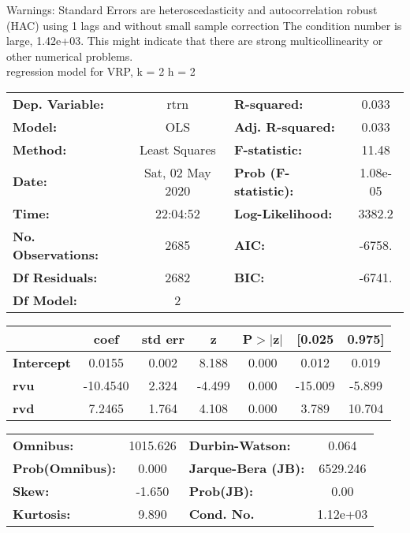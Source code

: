 Warnings: \newline
 [1] Standard Errors are heteroscedasticity and autocorrelation robust (HAC) using 1 lags and without small sample correction \newline
 [2] The condition number is large, 1.42e+03. This might indicate that there are \newline
 strong multicollinearity or other numerical problems.\\ 

regression model for VRP, k = 2 h = 2\begin{center}
\begin{tabular}{lclc}
\toprule
\textbf{Dep. Variable:}    &       rtrn       & \textbf{  R-squared:         } &     0.033   \\
\textbf{Model:}            &       OLS        & \textbf{  Adj. R-squared:    } &     0.033   \\
\textbf{Method:}           &  Least Squares   & \textbf{  F-statistic:       } &     11.48   \\
\textbf{Date:}             & Sat, 02 May 2020 & \textbf{  Prob (F-statistic):} &  1.08e-05   \\
\textbf{Time:}             &     22:04:52     & \textbf{  Log-Likelihood:    } &    3382.2   \\
\textbf{No. Observations:} &        2685      & \textbf{  AIC:               } &    -6758.   \\
\textbf{Df Residuals:}     &        2682      & \textbf{  BIC:               } &    -6741.   \\
\textbf{Df Model:}         &           2      & \textbf{                     } &             \\
\bottomrule
\end{tabular}
\begin{tabular}{lcccccc}
                   & \textbf{coef} & \textbf{std err} & \textbf{z} & \textbf{P$> |$z$|$} & \textbf{[0.025} & \textbf{0.975]}  \\
\midrule
\textbf{Intercept} &       0.0155  &        0.002     &     8.188  &         0.000        &        0.012    &        0.019     \\
\textbf{rvu}       &     -10.4540  &        2.324     &    -4.499  &         0.000        &      -15.009    &       -5.899     \\
\textbf{rvd}       &       7.2465  &        1.764     &     4.108  &         0.000        &        3.789    &       10.704     \\
\bottomrule
\end{tabular}
\begin{tabular}{lclc}
\textbf{Omnibus:}       & 1015.626 & \textbf{  Durbin-Watson:     } &    0.064  \\
\textbf{Prob(Omnibus):} &   0.000  & \textbf{  Jarque-Bera (JB):  } & 6529.246  \\
\textbf{Skew:}          &  -1.650  & \textbf{  Prob(JB):          } &     0.00  \\
\textbf{Kurtosis:}      &   9.890  & \textbf{  Cond. No.          } & 1.12e+03  \\
\bottomrule
\end{tabular}
\end{center}

